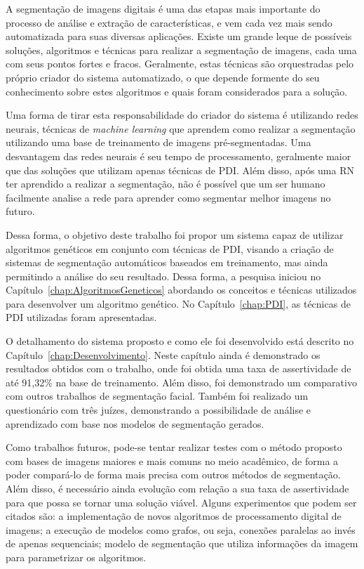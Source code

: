 \documentclass[12pt,oneside,a4paper,english,french,spanish,brazil,]{abntex2}
\begin{document}
A segmentação de imagens digitais é uma das etapas mais importante do processo de análise e extração de características, e vem cada vez mais sendo automatizada para suas diversas aplicações. Existe um grande leque de possíveis soluções, algoritmos e técnicas para realizar a segmentação de imagens, cada uma com seus pontos fortes e fracos. Geralmente, estas técnicas são orquestradas pelo próprio criador do sistema automatizado, o que depende formente do seu conhecimento sobre estes algoritmos e quais foram considerados para a solução.

Uma forma de tirar esta responsabilidade do criador do sistema é utilizando redes neurais, técnicas de \textit{machine learning} que aprendem como realizar a segmentação utilizando uma base de treinamento de imagens pré-segmentadas. Uma desvantagem das redes neurais é seu tempo de processamento, geralmente maior que das soluções que utilizam apenas técnicas de PDI. Além disso, após uma RN ter aprendido a realizar a segmentação, não é possível que um ser humano facilmente analise a rede para aprender como segmentar melhor imagens no futuro.

Dessa forma, o objetivo deste trabalho foi propor um sistema capaz de utilizar algoritmos genéticos em conjunto com técnicas de PDI, visando a criação de sistemas de segmentação automáticos baseados em treinamento, mas ainda permitindo a análise do seu resultado. Dessa forma, a pesquisa iniciou no Capítulo~\ref{chap:AlgoritmosGeneticos} abordando os conceitos e técnicas utilizados para desenvolver um algoritmo genético. No Capítulo~\ref{chap:PDI}, as técnicas de PDI utilizadas foram apresentadas.

O detalhamento do sistema proposto e como ele foi desenvolvido está descrito no Capítulo~\ref{chap:Desenvolvimento}. Neste capítulo ainda é demonstrado os resultados obtidos com o trabalho, onde foi obtida uma taxa de assertividade de até 91,32\% na base de treinamento. Além disso, foi demonstrado um comparativo com outros trabalhos de segmentação facial. Também foi realizado um questionário com três juízes, demonstrando a possibilidade de análise e aprendizado com base nos modelos de segmentação gerados.

Como trabalhos futuros, pode-se tentar realizar testes com o método proposto com bases de imagens maiores e mais comuns no meio acadêmico, de forma a poder compará-lo de forma mais precisa com outros métodos de segmentação.  Além disso, é necessário ainda evolução com relação a sua taxa de assertividade para que possa se tornar uma solução viável. Alguns experimentos que podem ser citados são: a implementação de novos algoritmos de processamento digital de imagens; a execução de modelos como grafos, ou seja, conexões paralelas ao invés de apenas sequenciais; modelo de segmentação que utiliza informações da imagem para parametrizar os algoritmos.
\end{document}
